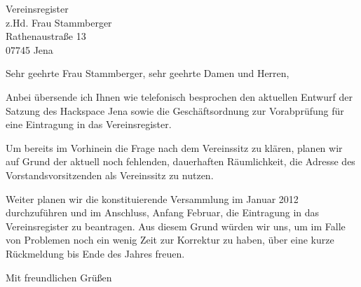 \documentclass[fontsize=12pt,paper=a4,DIN]{scrlttr2}
\date{7. Dezember 2011}
\begin{document}
\begin{letter}{Vereinsregister \\
	z.Hd. Frau Stammberger \\
	Rathenaustraße 13 \\
	07745 Jena}


\opening{Sehr geehrte Frau Stammberger, sehr geehrte Damen und Herren,}

Anbei übersende ich Ihnen wie telefonisch besprochen den aktuellen
Entwurf der Satzung des Hackspace Jena sowie die Geschäftsordnung
zur Vorabprüfung für eine Eintragung in das Vereinsregi\-ster.

Um bereits im Vorhinein die Frage nach dem Vereinssitz zu klären,
planen wir auf Grund der aktuell noch fehlenden, dauerhaften
Räumlichkeit, die Adresse des Vorstandsvor\-sitz\-enden als Vereinssitz
zu nutzen.

Weiter planen wir die konstituierende Versammlung im Januar 2012
durchzuführen und im Anschluss, Anfang Februar, die Eintragung in
das Vereinsregister zu beantragen. Aus diesem Grund würden wir uns,
um im Falle von Problemen noch ein wenig Zeit zur Korrektur zu haben,
über eine kurze Rückmeldung bis Ende des Jahres freuen.


\closing{Mit freundlichen Grüßen}

\end{letter}
\end{document}
